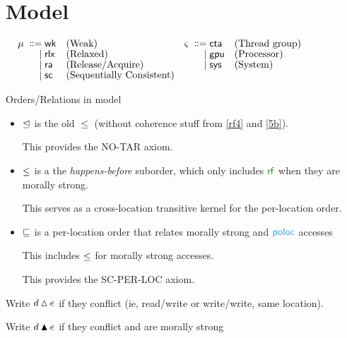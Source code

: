 \section{Model}

\begin{align*}
  \mu \;\mathrel{\mathord{\vcentcolon}\mkern-1mu\mathord{\vcentcolon}\mathord{{=}}}\;& {\mathsf{wk}} &&\text{{(Weak)}}                      &\varsigma \;\mathrel{\mathord{\vcentcolon}\mkern-1mu\mathord{\vcentcolon}\mathord{{=}}}\;& {\mathsf{cta}} &&\text{(Thread group)} &\hbox{$\;\mkern60mu\;$}&
  \\[-1ex] \;\mathrel{|}\;& {\mathsf{rlx}} &&\text{{(Relaxed)}}                & \;\mathrel{|}\;&{\mathsf{gpu}}   &&\text{(Processor)}                                   
  \\[-1ex] \;\mathrel{|}\;& {\mathsf{ra}} &&\text{{(Release/Acquire)}}         & \;\mathrel{|}\;&{\mathsf{sys}}  &&\text{(System)}                                         
  \\[-1ex] \;\mathrel{|}\;& {\mathsf{sc}} &&\text{{(Sequentially Consistent)}}    
\end{align*}

Orders/Relations in model
\begin{itemize}
\item $\trianglelefteq$ is the old $\le$ (without coherence stuff from \ref{rf4} and \ref{5b}).

  This provides the NO-TAR axiom.
\item $\le$ is a the \emph{happens-before} suborder, which only includes $\rrf$ when they are morally strong.

  This serves as a cross-location transitive kernel for the per-location order.
  
\item $\sqsubseteq$ is a per-location order that relates morally strong  and $\rpoloc$ accesses

  This includes $\le$ for  morally strong accesses.

  This provides the SC-PER-LOC axiom.

\end{itemize}

Write $d\mathbin{\vartriangle}e$ if they conflict (ie, read/write or write/write, same location).

Write $d\mathbin{\blacktriangle}e$ if they conflict and are morally strong

